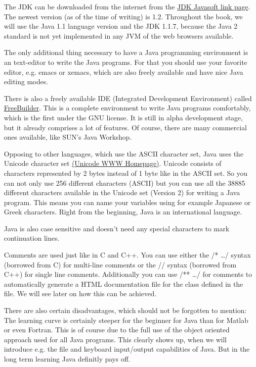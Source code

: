 The JDK can be downloaded from the internet from the 
\href{http://www.javasoft.com}{JDK Javasoft link page}.
The newest version (as of the time of writing) is 1.2. 
Throughout the book,
we will use the Java 1.1 language version and the JDK 1.1.7,
because the Java 2 standard is not yet implemented in any JVM of the
web browsers available.

The only additional thing necessary to have a Java programming
environment is an text-editor to write the Java programs. For that
you should use your favorite editor, e.g. emacs or xemacs, which are
also freely available and have nice Java editing modes.

There is also a freely available IDE (Integrated Development 
Environment) called \href{http://www.freebuilder.org/}{FreeBuilder}.
This is a complete environment to write Java programs comfortably,
which is the first under the GNU license. It is still in alpha
development stage, but it already comprises a lot of features. Of
course, there are many commercial ones available, like SUN's Java Workshop.

Opposing to other languages, which use the ASCII character set, Java
uses the Unicode character set \href{http://unicode.org}{(Unicode WWW
Homepage)}. 
Unicode consists of characters represented
by 2 bytes instead of 1 byte like in the ASCII set. So you can not only
use 256 different characters (ASCII) but you can use all the 38885 different
characters available in the Unicode set (Version 2) for writing a Java program.
This means you can name your variables using for example Japanese or Greek
characters. Right from the beginning, Java is an international language.

Java is also case sensitive and doesn't need any special characters
to mark continuation lines. 

Comments are used just like in C and C++.
You can use either the /* \ldots */ syntax (borrowed from C) for
multi-line comments or the // syntax (borrowed from C++) for single
line comments. Additionally you can use /** \ldots */ for comments
to automatically generate a HTML documentation file for the class
defined in the file. We will see later on how this can be achieved.
 
There are also certain disadvantages, which should not be forgotten
to mention: The learning curve is certainly steeper for the beginner
for Java than for Matlab or even Fortran. This is of course due
to the full use of the object oriented approach used for all Java
programs. This clearly shows up, when we will introduce e.g. the
file and keyboard input/output capabilities of Java.
But in the long term learning Java definitly pays off. 

